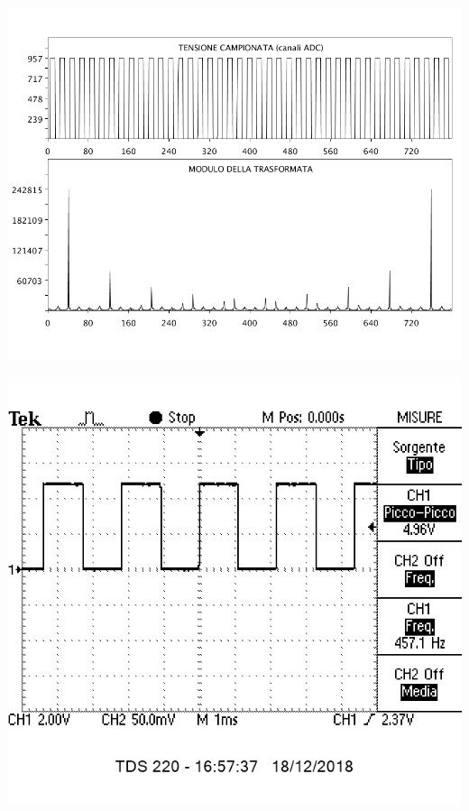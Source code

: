 \documentclass[10pt,oneside,a4paper]{article}
\newenvironment{Figure}
  {\par\medskip\noindent\minipage{\linewidth}}
  {\endminipage\par\medskip}
\begin{document}
\begin{multicols}{2}
\begin{Figure}
	\begin{center}
	\includegraphics[width=\linewidth]{quadra}
	\label{fig:quadra}
	\end{center}
\end{Figure}

\begin{Figure}
	\begin{center}
	\includegraphics[width=0.8\linewidth]{quadraosc}
	\label{fig:quadraosc}
	\end{center}
\end{Figure}


\end{multicols}
\end{document}
